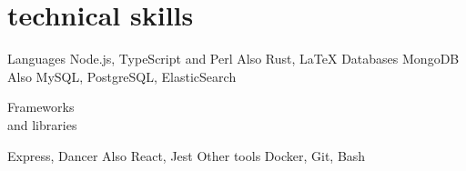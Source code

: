 \documentclass[a4paper]{friggeri-cv}
\begin{document}
\section{technical skills}

\begin{entrylist}
    \entry
        {Languages}
        {Node.js, TypeScript and Perl}
        {}
        {\small Also Rust, \LaTeX}
        {\vspace{-0.5cm}}
    \entry
        {Databases}
        {MongoDB}
        {}
        {\small Also MySQL, PostgreSQL, ElasticSearch}
        {\vspace{-0.5cm}}
    \entry
    {\parbox[t][][t]{2.3cm}{Frameworks\\{\small and libraries}}}
        {Express, Dancer}
        {}
        {\small Also React, Jest}
        {\vspace{-0.4cm}}
    \entry
        {Other tools}
        {Docker, Git, Bash}
        {}
        {}
        {\vspace{-3.8cm}}
\end{entrylist}
\end{document}
